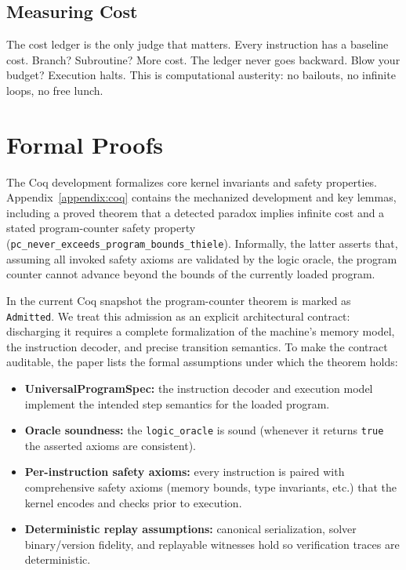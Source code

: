 \documentclass[11pt]{article}
\begin{document}
\subsection{Measuring Cost}
The cost ledger is the only judge that matters. Every instruction has a baseline cost. Branch? Subroutine? More cost. The ledger never goes backward. Blow your budget? Execution halts. This is computational austerity: no bailouts, no infinite loops, no free lunch.

\section{Formal Proofs}
The Coq development formalizes core kernel invariants and safety properties. Appendix~\ref{appendix:coq} contains the mechanized development and key lemmas, including a proved theorem that a detected paradox implies infinite cost and a stated program-counter safety property (\texttt{pc\_never\_exceeds\_program\_bounds\_thiele}). Informally, the latter asserts that, assuming all invoked safety axioms are validated by the logic oracle, the program counter cannot advance beyond the bounds of the currently loaded program.

In the current Coq snapshot the program-counter theorem is marked as \texttt{Admitted}. We treat this admission as an explicit architectural contract: discharging it requires a complete formalization of the machine's memory model, the instruction decoder, and precise transition semantics. To make the contract auditable, the paper lists the formal assumptions under which the theorem holds:

\begin{itemize}
  \item \textbf{UniversalProgramSpec:} the instruction decoder and execution model implement the intended step semantics for the loaded program.
  \item \textbf{Oracle soundness:} the \texttt{logic\_oracle} is sound (whenever it returns \texttt{true} the asserted axioms are consistent).
  \item \textbf{Per-instruction safety axioms:} every instruction is paired with comprehensive safety axioms (memory bounds, type invariants, etc.) that the kernel encodes and checks prior to execution.
  \item \textbf{Deterministic replay assumptions:} canonical serialization, solver binary/version fidelity, and replayable witnesses hold so verification traces are deterministic.
\end{itemize}
\end{document}
